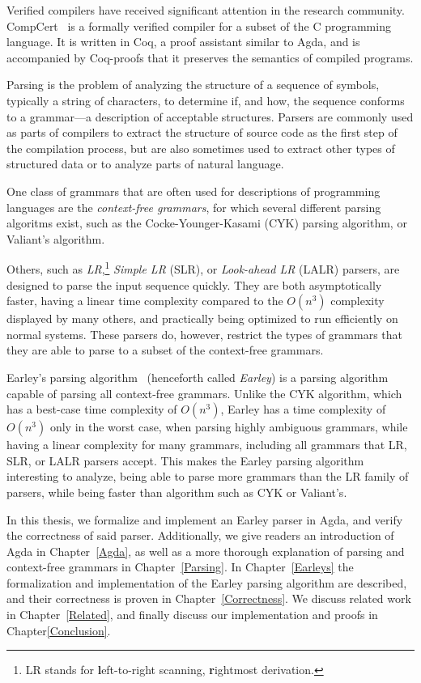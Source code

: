	Verified compilers have received significant attention in the research
	community. CompCert~\cite{Leroy} is a formally verified compiler for a
	subset of the C programming language. It is written in Coq, a proof
	assistant similar to Agda, and is accompanied by Coq-proofs that it
	preserves the semantics of compiled programs.

	Parsing is the problem of analyzing the structure of a sequence of
	symbols, typically a string of characters, to determine if, and how, the
	sequence conforms to a grammar---a description of acceptable structures.
	Parsers are commonly used as parts of compilers to extract the structure of
	source code as the first step of the compilation process, but are also
	sometimes used to extract other types of structured data or to analyze
	parts of natural language.

	One class of grammars that are often used for descriptions of programming
	languages are the \emph{context-free grammars}, for which several different
	parsing algoritms exist, such as the Cocke-Younger-Kasami (CYK) parsing
	algorithm, or Valiant's algorithm.

	Others, such as \emph{LR},\footnote{LR stands for \textbf{l}eft-to-right
	scanning, \textbf{r}ightmost derivation.} \emph{Simple LR} (SLR), or
	\emph{Look-ahead LR} (LALR) parsers, are designed to parse the input
	sequence quickly. They are both asymptotically faster, having a linear time
	complexity compared to the $O(n^3)$ complexity displayed by many others,
	and practically being optimized to run efficiently on normal systems.
	These parsers do, however, restrict the types of grammars that they are
	able to parse to a subset of the context-free grammars.

	Earley's parsing algorithm~\cite{Earley} (henceforth called \emph{Earley})
	is a parsing algorithm capable of parsing all context-free grammars. Unlike
	the CYK algorithm, which has a best-case time complexity of $O(n^3)$,
	Earley has a time complexity of $O(n^3)$ only in the worst case, when
	parsing highly ambiguous grammars, while having a linear complexity for
	many grammars, including all grammars that LR, SLR, or LALR parsers accept.
	This makes the Earley parsing algorithm interesting to analyze, being able
	to parse more grammars than the LR family of parsers, while being faster
	than algorithm such as CYK or Valiant's.

	In this thesis, we formalize and implement an Earley parser in Agda, and
	verify the correctness of said parser. Additionally, we give readers an
	introduction of Agda in Chapter~\ref{Agda}, as well as a more thorough
	explanation of parsing and context-free grammars in Chapter~\ref{Parsing}.
	In Chapter~\ref{Earleys} the formalization and implementation of the Earley
	parsing algorithm are described, and their correctness is proven in
	Chapter~\ref{Correctness}. We discuss related work in
	Chapter~\ref{Related}, and finally discuss our implementation and proofs in
	Chapter\ref{Conclusion}.

